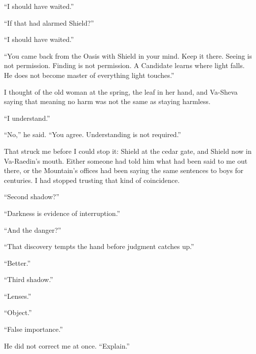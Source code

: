 ``I should have waited.''\par

``If that had alarmed Shield?''\par

``I should have waited.''\par

``You came back from the Oasis with Shield in your mind. Keep it there. Seeing is not permission. Finding is not permission. A Candidate learns where light falls. He does not become master of everything light touches.''\par

I thought of the old woman at the spring, the leaf in her hand, and Va-Sheva saying that meaning no harm was not the same as staying harmless.\par

``I understand.''\par

``No,'' he said. ``You agree. Understanding is not required.''\par

That struck me before I could stop it: Shield at the cedar gate, and Shield now in Va-Raedin's mouth. Either someone had told him what had been said to me out there, or the Mountain's offices had been saying the same sentences to boys for centuries. I had stopped trusting that kind of coincidence.\par

``Second shadow?''\par

``Darkness is evidence of interruption.''\par

``And the danger?''\par

``That discovery tempts the hand before judgment catches up.''\par

``Better.''\par

\ornament

``Third shadow.''\par

``Lenses.''\par

``Object.''\par

``False importance.''\par

He did not correct me at once. ``Explain.''\par

